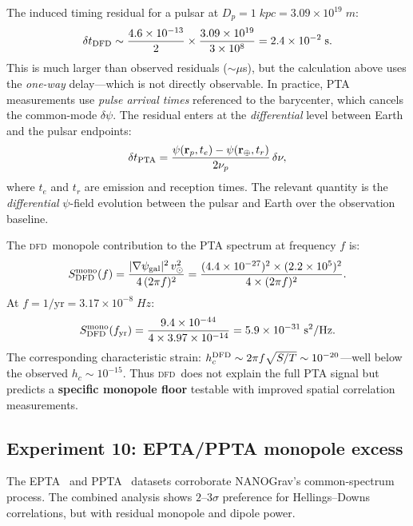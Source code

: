 \documentclass[aps,prd,twocolumn,superscriptaddress,nofootinbib,longbibliography]{revtex4-2}
\newcommand{\DFD}{\textsc{dfd}}
\begin{document}
The induced timing residual for a pulsar at $D_p = 1\;\si{kpc} = 3.09\times10^{19}\;\si{m}$:
\begin{equation}
\delta t_{\rm DFD} \sim \frac{4.6\times10^{-13}}{2}\times\frac{3.09\times10^{19}}{3\times10^8}
= 2.4\times10^{-2}\;\si{s}.
\end{equation}
This is much larger than observed residuals ($\sim\mu$s), but the
calculation above uses the \emph{one-way} delay---which is not directly
observable. In practice, PTA measurements use \emph{pulse arrival times}
referenced to the barycenter, which cancels the common-mode $\delta\psi$.
The residual enters at the \emph{differential} level between Earth and
the pulsar endpoints:
\begin{equation}
\delta t_{\rm PTA} = \frac{\psi(\mathbf{r}_p, t_e) - \psi(\mathbf{r}_\oplus, t_r)}{2\nu_p}\,\delta\nu,
\end{equation}
where $t_e$ and $t_r$ are emission and reception times. The relevant
quantity is the \emph{differential} $\psi$-field evolution between
the pulsar and Earth over the observation baseline.

The \DFD\ monopole contribution to the PTA spectrum at frequency $f$ is:
\begin{equation}
S_{\rm DFD}^{\rm mono}(f) = \frac{|\nabla\psi_{\rm gal}|^2\,v_\odot^2}{4\,(2\pi f)^2}
= \frac{(4.4\times10^{-27})^2\times(2.2\times10^5)^2}{4\times(2\pi f)^2}.
\end{equation}
At $f = 1/\text{yr} = 3.17\times10^{-8}\;\si{Hz}$:
\begin{equation}
S_{\rm DFD}^{\rm mono}(f_{\rm yr}) = \frac{9.4\times10^{-44}}{4\times3.97\times10^{-14}}
= 5.9\times10^{-31}\;\si{s^2/Hz}.
\end{equation}
The corresponding characteristic strain:
$h_c^{\rm DFD} \sim 2\pi f\sqrt{S/T} \sim 10^{-20}$---well below the
observed $h_c \sim 10^{-15}$. Thus \DFD\ does not explain the full
PTA signal but predicts a \textbf{specific monopole floor} testable
with improved spatial correlation measurements.

\subsection{Experiment 10: EPTA/PPTA monopole excess}\label{sec:EPTA}

The EPTA~\cite{EPTA2023} and PPTA~\cite{PPTA2023} datasets corroborate
NANOGrav's common-spectrum process. The combined analysis shows
$2$--$3\sigma$ preference for Hellings--Downs correlations, but with
residual monopole and dipole power.
\end{document}
